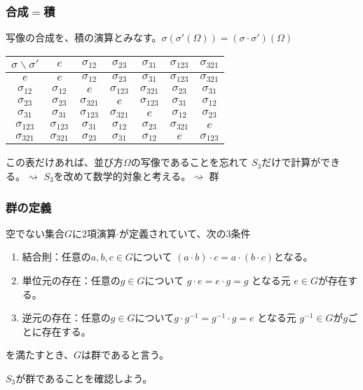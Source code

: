 \documentclass[12pt, t]{beamer}
\begin{document}
\begin{frame}
\frametitle{合成$=$積}
写像の合成を、積の演算とみなす。$\sigma(\sigma'(\Omega)) = (\sigma \cdot \sigma')(\Omega)$
\begin{center}
\begin{tabular}{c|cccccc}
  $\sigma \backslash \sigma'$ & $e$            & $\sigma_{12}$  & $\sigma_{23}$  & $\sigma_{31}$  & $\sigma_{123}$ & $\sigma_{321}$ \\ \hline
  $e$                         & $e$            & $\sigma_{12}$  & $\sigma_{23}$  & $\sigma_{31}$  & $\sigma_{123}$ & $\sigma_{321}$ \\
  $\sigma_{12}$               & $\sigma_{12}$  & $e$            & $\sigma_{123}$ & $\sigma_{321}$ & $\sigma_{23}$  & $\sigma_{31}$  \\
  $\sigma_{23}$               & $\sigma_{23}$  & $\sigma_{321}$ & $e$            & $\sigma_{123}$ & $\sigma_{31}$  & $\sigma_{12}$  \\
  $\sigma_{31}$               & $\sigma_{31}$  & $\sigma_{123}$ & $\sigma_{321}$ & $e$            & $\sigma_{12}$  & $\sigma_{23}$  \\
  $\sigma_{123}$              & $\sigma_{123}$ & $\sigma_{31}$  & $\sigma_{12}$  & $\sigma_{23}$  & $\sigma_{321}$ & $e$            \\
  $\sigma_{321}$              & $\sigma_{321}$ & $\sigma_{23}$  & $\sigma_{31}$  & $\sigma_{12}$  & $e$            & $\sigma_{123}$
\end{tabular}
\end{center}
この表だけあれば、並び方$\Omega$の写像であることを忘れて
$S_3$だけで計算ができる。$\rightsquigarrow$ $S_3$を改めて数学的対象と考える。$\rightsquigarrow$ 群
\end{frame}


\begin{frame}
\frametitle{群の定義}
空でない集合$G$に$2$項演算$\cdot$が定義されていて、次の$3$条件
\begin{enumerate}
\item 結合則：任意の$a, b, c \in G$について $(a \cdot b) \cdot c = a \cdot (b \cdot c)$となる。
\item 単位元の存在：任意の$g \in G$について $g \cdot e = e \cdot g = g$ となる元 $e \in G$が存在する。
\item 逆元の存在：任意の$g \in G$について$g \cdot g^{-1} = g^{-1} \cdot g = e$ となる元 $g^{-1} \in G$が$g$ごとに存在する。
\end{enumerate}
を満たすとき、$G$は群であると言う。

$S_3$が群であることを確認しよう。
\end{frame}
\end{document}
